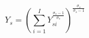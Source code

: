 \begin{equation}
    Y_s = \left(
        \sum_{i=1}^I Y_{si}^{\frac{\sigma_s-1}{\sigma_s}}
    \right)^{\frac{\sigma_s}{\sigma_s-1}}
\end{equation}